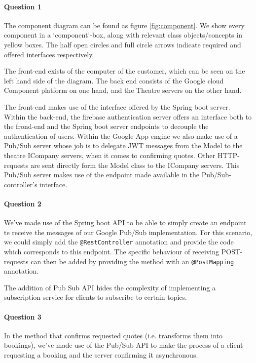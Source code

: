 \documentclass{ds-report}
\begin{document}
	\maketitle

	\paragraph{Question 1}
	The component diagram can be found as figure \ref{fig:component}. We show every component in a `component'-box, along with relevant class objects/concepts in yellow boxes. The half open circles and full circle arrows indicate required and offered interfaces respectively.
	
	The front-end exists of the computer of the customer, which can be seen on the left hand side of the diagram. The back end consists of the Google cloud Component platform on one hand, and the Theatre servers on the other hand.
	
	The front-end makes use of the interface offered by the Spring boot server. Within the back-end, the firebase authentication server offers an interface both to the frond-end and the Spring boot server endpoints to decouple the authentication of users. Within the Google App engine we also make use of a Pub/Sub server whose job is to delegate JWT messages from the Model to the theatre ICompany servers, when it comes to confirming quotes. Other HTTP-requests are sent directly form the Model class to the ICompany servers. This Pub/Sub server makes use of the endpoint made available in the Pub/Sub-controller's interface.
	\paragraph{Question 2} 
	We've made use of the Spring boot API to be able to simply create an endpoint te receive the messages of our Google Pub/Sub implementation. For this scenario, we could simply add the \texttt{@RestController} annotation and provide the code which corresponds to this endpoint. The specific behaviour of receiving POST-requests can then be added by providing the method with an \texttt{@PostMapping} annotation.
	
	The addition of Pub Sub API hides the complexity of implementing a subscription service for clients to subscribe to certain topics. 
	
	\paragraph{Question 3} 
	In the method that confirms requested quotes (i.e. transforms them into bookings), we've made use of the Pub/Sub API to make the process of a client requesting a booking and the server confirming it asynchronous. 
	
\end{document}
